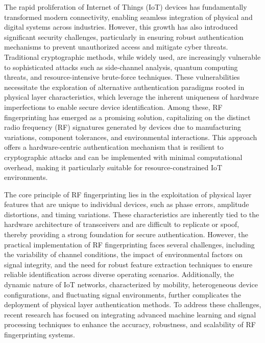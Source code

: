 \documentclass[conference]{IEEEtran}
\begin{document}
The rapid proliferation of Internet of Things (IoT) devices has fundamentally transformed modern connectivity, enabling seamless integration of physical and digital systems across industries. However, this growth has also introduced significant security challenges, particularly in ensuring robust authentication mechanisms to prevent unauthorized access and mitigate cyber threats. Traditional cryptographic methods, while widely used, are increasingly vulnerable to sophisticated attacks such as side-channel analysis, quantum computing threats, and resource-intensive brute-force techniques. These vulnerabilities necessitate the exploration of alternative authentication paradigms rooted in physical layer characteristics, which leverage the inherent uniqueness of hardware imperfections to enable secure device identification. Among these, RF fingerprinting has emerged as a promising solution, capitalizing on the distinct radio frequency (RF) signatures generated by devices due to manufacturing variations, component tolerances, and environmental interactions. This approach offers a hardware-centric authentication mechanism that is resilient to cryptographic attacks and can be implemented with minimal computational overhead, making it particularly suitable for resource-constrained IoT environments.  

The core principle of RF fingerprinting lies in the exploitation of physical layer features that are unique to individual devices, such as phase errors, amplitude distortions, and timing variations. These characteristics are inherently tied to the hardware architecture of transceivers and are difficult to replicate or spoof, thereby providing a strong foundation for secure authentication. However, the practical implementation of RF fingerprinting faces several challenges, including the variability of channel conditions, the impact of environmental factors on signal integrity, and the need for robust feature extraction techniques to ensure reliable identification across diverse operating scenarios. Additionally, the dynamic nature of IoT networks, characterized by mobility, heterogeneous device configurations, and fluctuating signal environments, further complicates the deployment of physical layer authentication methods. To address these challenges, recent research has focused on integrating advanced machine learning and signal processing techniques to enhance the accuracy, robustness, and scalability of RF fingerprinting systems.  
\end{document}
